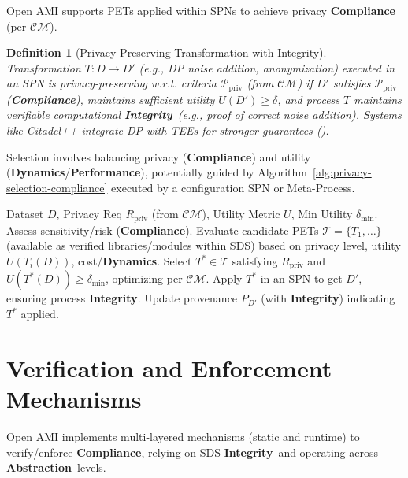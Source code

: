 \documentclass[12pt,a4paper]{report}
\renewcommand{\citep}[1]{\textit{\scriptsize{(\cite{#1})}}}
\newtheorem{definition}{Definition}[section]
\newcommand{\Integrity}{\textbf{Integrity}}
\newcommand{\Abstraction}{\textbf{Abstraction}}
\newcommand{\Dynamics}{\textbf{Dynamics}}
\begin{document}
	Open AMI supports PETs applied within SPNs to achieve privacy \textbf{Compliance} (per $\mathcal{CM}$).
	\begin{definition}[Privacy-Preserving Transformation with Integrity]
		\label{def:privacy-transform-compliance}
		Transformation $T: D \rightarrow D'$ (e.g., DP noise addition, anonymization) executed in an SPN is privacy-preserving w.r.t. criteria $\mathcal{P}_{\text{priv}}$ (from $\mathcal{CM}$) if $D'$ satisfies $\mathcal{P}_{\text{priv}}$ (\textbf{Compliance}), maintains sufficient utility $U(D') \ge \delta$, and process $T$ maintains verifiable computational \Integrity\ (e.g., proof of correct noise addition). Systems like Citadel++ integrate DP with TEEs for stronger guarantees \citep{AdditionalCitationRef54}.
	\end{definition}
	Selection involves balancing privacy (\textbf{Compliance}) and utility (\Dynamics/\textbf{Performance}), potentially guided by Algorithm~\ref{alg:privacy-selection-compliance} executed by a configuration SPN or Meta-Process.
	
	\begin{algorithm}[H]
		\caption{Privacy-Preserving Transformation Selection (Conceptual)}
		\label{alg:privacy-selection-compliance}
		\begin{algorithmic}[1]
			\Require Dataset $D$, Privacy Req $R_{\text{priv}}$ (from $\mathcal{CM}$), Utility Metric $U$, Min Utility $\delta_{\text{min}}$.
			\State Assess sensitivity/risk (\textbf{Compliance}).
			\State Evaluate candidate PETs $\mathcal{T} = \{T_1, \dots\}$ (available as verified libraries/modules within SDS) based on privacy level, utility $U(T_i(D))$, cost/\Dynamics.
			\State Select $T^* \in \mathcal{T}$ satisfying $R_{\text{priv}}$ and $U(T^*(D)) \ge \delta_{\text{min}}$, optimizing per $\mathcal{CM}$.
			\State Apply $T^*$ in an SPN to get $D'$, ensuring process \Integrity.
			\State Update provenance $P_{D'}$ (with \Integrity) indicating $T^*$ applied.
		\end{algorithmic}
	\end{algorithm}
	
	\section{Verification and Enforcement Mechanisms} %
	\label{sec:5-6} %
	
	Open AMI implements multi-layered mechanisms (static and runtime) to verify/enforce \textbf{Compliance}, relying on SDS \Integrity\ and operating across \Abstraction\ levels.
	
\end{document}
